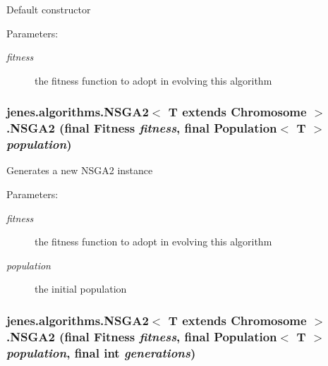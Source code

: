 Default constructor \begin{Desc}
\item[Parameters:]
\begin{description}
\item[{\em fitness}]the fitness function to adopt in evolving this algorithm \end{description}
\end{Desc}
\hypertarget{classjenes_1_1algorithms_1_1_n_s_g_a2_3_01_t_01extends_01_chromosome_01_4_49f57f66489874c5bf12b3f9c89e6fcc}{
\subsubsection[NSGA2]{\setlength{\rightskip}{0pt plus 5cm}jenes.algorithms.NSGA2$<$ T extends Chromosome $>$.NSGA2 (final Fitness {\em fitness}, \/  final Population$<$ T $>$ {\em population})}}
\label{classjenes_1_1algorithms_1_1_n_s_g_a2_3_01_t_01extends_01_chromosome_01_4_49f57f66489874c5bf12b3f9c89e6fcc}


Generates a new NSGA2 instance 

\begin{Desc}
\item[Parameters:]
\begin{description}
\item[{\em fitness}]the fitness function to adopt in evolving this algorithm \item[{\em population}]the initial population \end{description}
\end{Desc}
\hypertarget{classjenes_1_1algorithms_1_1_n_s_g_a2_3_01_t_01extends_01_chromosome_01_4_4da7d36c029be00959ea063643833486}{
\subsubsection[NSGA2]{\setlength{\rightskip}{0pt plus 5cm}jenes.algorithms.NSGA2$<$ T extends Chromosome $>$.NSGA2 (final Fitness {\em fitness}, \/  final Population$<$ T $>$ {\em population}, \/  final int {\em generations})}}
\label{classjenes_1_1algorithms_1_1_n_s_g_a2_3_01_t_01extends_01_chromosome_01_4_4da7d36c029be00959ea063643833486}


